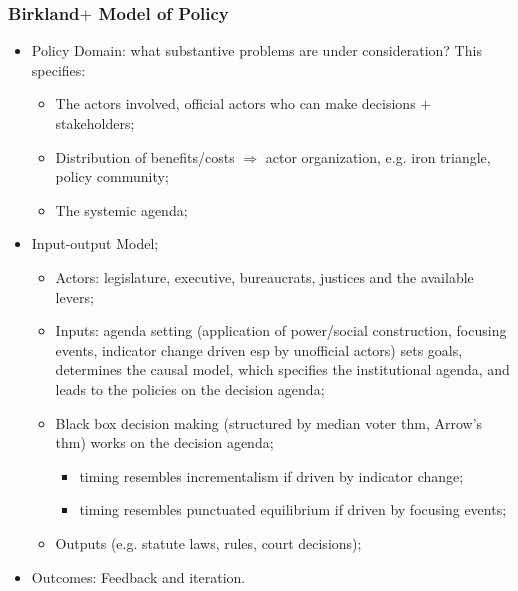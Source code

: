 \documentclass[aspectratio=169]{beamer}
\theoremstyle{principle}
\begin{document}
\begin{frame}
\frametitle{Birkland$+$ Model of Policy}
\begin{itemize}
\item Policy Domain: what substantive problems are under consideration?  This specifies:
\begin{itemize}
\item The actors involved, official actors who can make decisions $+$ stakeholders; 
\item Distribution of benefits/costs $\Rightarrow$ actor organization, e.g. iron triangle, policy community;
\item The systemic agenda; 
\end{itemize}
\bigskip
\item \color{black}Input-output Model;
\begin{itemize}
\item Actors: legislature, executive, bureaucrats, justices and the available levers;
\item Inputs: agenda setting (application of power/social construction, focusing events, indicator change driven esp by unofficial actors) sets goals, determines the causal model, which specifies the institutional agenda, and leads to the policies on the decision agenda;
\item Black box decision making (structured by median voter thm, Arrow's thm) works on the decision agenda;
\begin{itemize}
\item timing resembles incrementalism if driven by indicator change;
\item timing resembles punctuated equilibrium if driven by focusing events;
 \end{itemize}
\item Outputs (e.g. statute laws, rules, court decisions);
\end{itemize}
\bigskip
\item Outcomes: Feedback and iteration.
\end{itemize}
\end{frame}
\end{document}
